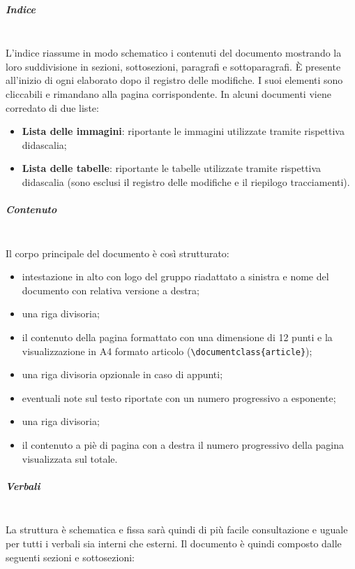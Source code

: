             \subparagraph{Indice}\mbox{}\\ [1mm]
                L'indice riassume in modo schematico i contenuti del documento mostrando la loro suddivisione in sezioni, sottosezioni, paragrafi e sottoparagrafi.
                È presente all'inizio di ogni elaborato dopo il registro delle modifiche. I suoi elementi sono cliccabili e rimandano alla pagina
                corrispondente. In alcuni documenti viene corredato di due liste:
                \begin{itemize}
                    \item \textbf{Lista delle immagini}: riportante le immagini utilizzate tramite rispettiva didascalia;
                    \item \textbf{Lista delle tabelle}: riportante le tabelle utilizzate tramite rispettiva didascalia (sono esclusi il registro delle modifiche
                                                        e il riepilogo tracciamenti).
                \end{itemize}
            \subparagraph{Contenuto}\mbox{}\\ [1mm]
                Il corpo principale del documento è così strutturato:
                \begin{itemize}
                    \item intestazione in alto con logo del gruppo riadattato a sinistra e nome del documento con relativa versione a destra;
                    \item una riga divisoria;
                    \item il contenuto della pagina formattato con una dimensione di 12 punti e la visualizzazione in A4 formato articolo
                          (\verb|\documentclass{article}|);
                    \item una riga divisoria opzionale in caso di appunti;
                    \item eventuali note sul testo riportate con un numero progressivo a esponente;
                    \item una riga divisoria;
                    \item il contenuto a piè di pagina con a destra il numero progressivo della pagina visualizzata sul totale.
                \end{itemize}
            \subparagraph{Verbali}\mbox{}\\ [1mm]
                La struttura è schematica e fissa sarà quindi di più facile consultazione e uguale per tutti i verbali sia interni che esterni. Il documento è quindi composto dalle seguenti sezioni e sottosezioni:
